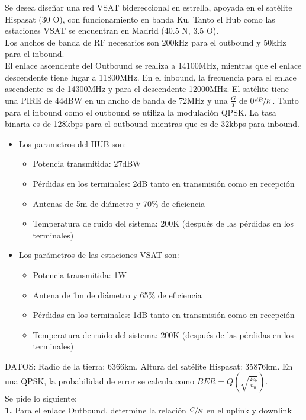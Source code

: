 \begin{exercise}[2]
	Se desea diseñar una red VSAT bidereccional en estrella, apoyada en el satélite Hispasat (30 O), con funcionamiento en banda Ku. Tanto el Hub como las estaciones VSAT se encuentran en Madrid (40.5 N, 3.5 O).\\
	Los anchos de banda de RF necesarios son 200kHz para el outbound y 50kHz para el inbound.\\
	El enlace ascendente del Outbound se realiza a 14100MHz, mientras que el enlace descendente tiene lugar a 11800MHz. En el inbound, la frecuencia para el enlace ascendente es de 14300MHz y para el descendente 12000MHz. El satélite tiene una PIRE de 44dBW en un ancho de banda de 72MHz y una $\frac{G}{T}$ de 0$\sfrac{dB}{K}$. Tanto para el inbound como el outbound se utiliza la modulación QPSK. La tasa binaria es de 128kbps para el outbound mientras que es de 32kbps para inbound.
	\begin{itemize}
		\item Los parametros del HUB son:
		\begin{itemize}
			\item Potencia transmitida: 27dBW 
			\item Pérdidas en los terminales: 2dB tanto en transmisión como en recepción
			\item Antenas de 5m de diámetro y 70\% de eficiencia
			\item Temperatura de ruido del sistema: 200K (después de las pérdidas en los terminales)
		\end{itemize}
		\item Los parámetros de las estaciones VSAT son:
		\begin{itemize}
			\item Potencia transmitida: 1W
			\item Antena de 1m de diámetro y 65\% de eficiencia
			\item Pérdidas en los terminales: 1dB tanto en transmisión como en recepción
			\item Temperatura de ruido del sistema: 200K (después de las pérdidas en los terminales)
		\end{itemize}
	\end{itemize}
	DATOS: Radio de la tierra: 6366km. Altura del satélite Hispasat: 35876km. En una QPSK, la probabilidad de error se calcula como $BER=Q(\sqrt{\frac{2e_b}{n_0}})$.\\
	Se pide lo siguiente:\\
	\textbf{1.} Para el enlace Outbound, determine la relación $\sfrac{C}{N}$ en el uplink y downlink\\ 

\end{exercise}
